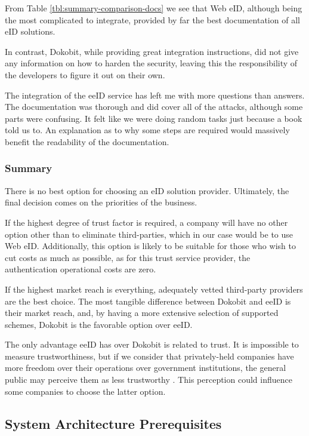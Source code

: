 From Table \ref{tbl:summary-comparison-docs} we see that Web eID, although being the most complicated to integrate, provided by far the best documentation of all eID solutions.

In contrast, Dokobit, while providing great integration instructions, did not give any information on how to harden the security, leaving this the responsibility of the developers to figure it out on their own.

The integration of the eeID service has left me with more questions than answers. The documentation was thorough and did cover all of the attacks, although some parts were confusing. It felt like we were doing random tasks just because a book told us to. An explanation as to why some steps are required would massively benefit the readability of the documentation.

\subsubsection{Summary}

There is no best option for choosing an eID solution provider. Ultimately, the final decision comes on the priorities of the business.

If the highest degree of trust factor is required, a company will have no other option other than to eliminate third-parties, which in our case would be to use Web eID. Additionally, this option is likely to be suitable for those who wish to cut costs as much as possible, as for this trust service provider, the authentication operational costs are zero.

If the highest market reach is everything, adequately vetted third-party providers are the best choice. The most tangible difference between Dokobit and eeID is their market reach, and, by having a more extensive selection of supported schemes, Dokobit is the favorable option over eeID.

The only advantage eeID has over Dokobit is related to trust. It is impossible to measure trustworthiness, but if we consider that privately-held companies have more freedom over their operations over government institutions, the general public may perceive them as less trustworthy \cite{ha2004factors}. This perception could influence some companies to choose the latter option.

\subsection{System Architecture Prerequisites}

